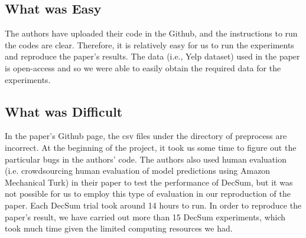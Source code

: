 \documentclass{article}
\begin{document}
\subsection{What was Easy}
The authors have uploaded their code in the Github, and the instructions to run the codes are clear. Therefore, it is relatively easy for us to run the experiments and reproduce the paper’s results.
The data (i.e., Yelp dataset) used in the paper is open-access and so we were able to easily obtain the required data for the experiments.

\subsection{What was Difficult}
In the paper’s Github page, the csv files under the directory of preprocess are incorrect.
At the beginning of the project, it took us some time to figure out the particular bugs in the authors' code. The authors also used human evaluation (i.e. crowdsourcing human evaluation of model
predictions using Amazon Mechanical Turk) in their paper to test the performance of DecSum, but it was not possible for us to employ this type of evaluation in our reproduction of the paper. Each
DecSum trial took around 14 hours to run. In order to reproduce the paper’s result, we have carried out more than 15 DecSum experiments, which took much time given the limited computing resources we
had.
\end{document}
